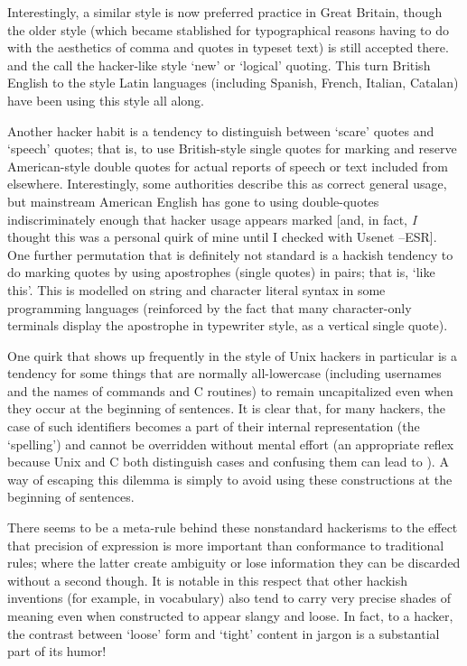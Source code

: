 Interestingly, a similar style is now preferred practice in Great Britain,
though the older style (which became stablished for typographical reasons
having to do with the aesthetics of comma and quotes in typeset text) is still
accepted there.   and the  call the hacker-like style `new' or `logical' quoting.
This turn British English to the style Latin languages (including Spanish,
French, Italian, Catalan) have been using this style all along.

Another hacker habit is a tendency to distinguish between `scare' quotes and
`speech' quotes; that is, to use British-style single quotes for marking and
reserve American-style double quotes for actual reports of speech or text
included from elsewhere. Interestingly, some authorities describe this as
correct general usage, but mainstream American English has gone to using
double-quotes indiscriminately enough that hacker usage appears marked [and, in
fact, \textit{I} thought this was a personal quirk of mine until I checked with
Usenet --ESR]. One further permutation that is definitely not standard is a
hackish tendency to do marking quotes by using apostrophes (single quotes) in
pairs; that is, `like this'. This is modelled on string and character literal
syntax in some programming languages (reinforced by the fact that many
character-only terminals display the apostrophe in typewriter style, as a
vertical single quote).

One quirk that shows up frequently in the  style of Unix
hackers in particular is a tendency for some things that are normally
all-lowercase (including usernames and the names of commands and C routines) to
remain uncapitalized even when they occur at the beginning of sentences. It is
clear that, for many hackers, the case of such identifiers becomes a part of
their internal representation (the `spelling') and cannot be overridden without
mental effort (an appropriate reflex because Unix and C both distinguish cases
and confusing them can lead to ). A way of escaping this
dilemma is simply to avoid using these constructions at the beginning of
sentences.

There seems to be a meta-rule behind these nonstandard hackerisms to the effect
that precision of expression is more important than conformance to traditional
rules; where the latter create ambiguity or lose information they can be
discarded without a second though. It is notable in this respect that other
hackish inventions (for example, in vocabulary) also tend to carry very precise
shades of meaning even when constructed to appear slangy and loose. In fact, to
a hacker, the contrast between `loose' form and `tight' content in jargon is a
substantial part of its humor!


